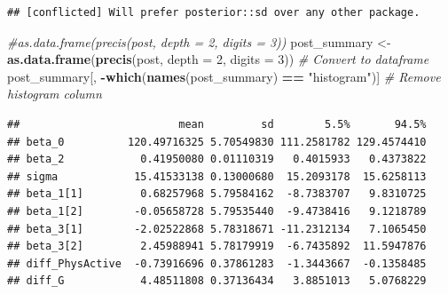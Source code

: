 \documentclass[
]{book}
\newenvironment{Shaded}{\begin{snugshade}}{\end{snugshade}}
\newcommand{\AttributeTok}[1]{\textcolor[rgb]{0.13,0.29,0.53}{#1}}
\newcommand{\CommentTok}[1]{\textcolor[rgb]{0.56,0.35,0.01}{\textit{#1}}}
\newcommand{\DecValTok}[1]{\textcolor[rgb]{0.00,0.00,0.81}{#1}}
\newcommand{\FunctionTok}[1]{\textcolor[rgb]{0.13,0.29,0.53}{\textbf{#1}}}
\newcommand{\NormalTok}[1]{#1}
\newcommand{\OtherTok}[1]{\textcolor[rgb]{0.56,0.35,0.01}{#1}}
\newcommand{\SpecialCharTok}[1]{\textcolor[rgb]{0.81,0.36,0.00}{\textbf{#1}}}
\newcommand{\StringTok}[1]{\textcolor[rgb]{0.31,0.60,0.02}{#1}}
\begin{document}
\begin{Shaded}
\end{Shaded}

\begin{verbatim}
## [conflicted] Will prefer posterior::sd over any other package.
\end{verbatim}

\begin{Shaded}
\begin{Highlighting}[]
\CommentTok{\#as.data.frame(precis(post, depth = 2, digits = 3))}
\NormalTok{post\_summary }\OtherTok{\textless{}{-}} \FunctionTok{as.data.frame}\NormalTok{(}\FunctionTok{precis}\NormalTok{(post, }\AttributeTok{depth =} \DecValTok{2}\NormalTok{, }\AttributeTok{digits =} \DecValTok{3}\NormalTok{))  }\CommentTok{\# Convert to dataframe}
\NormalTok{post\_summary[, }\SpecialCharTok{{-}}\FunctionTok{which}\NormalTok{(}\FunctionTok{names}\NormalTok{(post\_summary) }\SpecialCharTok{==} \StringTok{"histogram"}\NormalTok{)]  }\CommentTok{\# Remove histogram column}
\end{Highlighting}
\end{Shaded}

\begin{verbatim}
##                         mean         sd        5.5%       94.5%
## beta_0          120.49716325 5.70549830 111.2581782 129.4574410
## beta_2            0.41950080 0.01110319   0.4015933   0.4373822
## sigma            15.41533138 0.13000680  15.2093178  15.6258113
## beta_1[1]         0.68257968 5.79584162  -8.7383707   9.8310725
## beta_1[2]        -0.05658728 5.79535440  -9.4738416   9.1218789
## beta_3[1]        -2.02522868 5.78318671 -11.2312134   7.1065450
## beta_3[2]         2.45988941 5.78179919  -6.7435892  11.5947876
## diff_PhysActive  -0.73916696 0.37861283  -1.3443667  -0.1358485
## diff_G            4.48511808 0.37136434   3.8851013   5.0768229
\end{verbatim}
\end{document}
